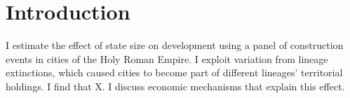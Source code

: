 \documentclass{article}
\begin{document}
\newpage

\setcounter{page}{1}
 
\section{Introduction}

I estimate the effect of state size on development using a panel of construction events in cities of the Holy Roman Empire. I exploit variation from lineage extinctions, which caused cities to become part of different lineages' territorial holdings. I find that X. I discuss economic mechanisms that explain this effect.

\newpage


\end{document}
